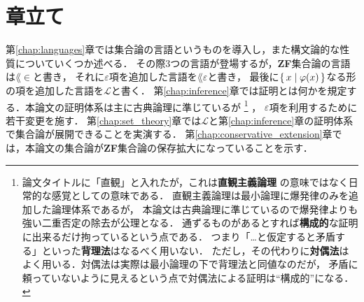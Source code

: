 \section{章立て}
	第\ref{chap:languages}章では集合論の言語というものを導入し，また構文論的な性質についていくつか述べる．
	その際3つの言語が登場するが，{\bf ZF}集合論の言語は$\lang{\in}$と書き，
	それに$\varepsilon$項を追加した言語を$\lang{\varepsilon}$と書き，
	最後に$\{\, x \mid \varphi(x)\, \}$なる形の項を追加した言語を$\mathcal{L}$と書く．
	第\ref{chap:inference}章では証明とは何かを規定する．本論文の証明体系は主に古典論理に準じているが
	\footnote{
		論文タイトルに「直観」と入れたが，これは{\bf 直観主義論理}
		の意味ではなく日常的な感覚としての意味である．
		直観主義論理は最小論理に爆発律のみを追加した論理体系であるが，
		本論文は古典論理に準じているので爆発律よりも強い二重否定の除去が公理となる．
		通ずるものがあるとすれば{\bf 構成的}な証明に出来るだけ拘っているという点である．
		つまり「…と仮定すると矛盾する」といった{\bf 背理法}はなるべく用いない．
		ただし，その代わりに{\bf 対偶法}はよく用いる．対偶法は実際は最小論理の下で背理法と同値なのだが，
		矛盾に頼っていないように見えるという点で対偶法による証明は``構成的''になる．
	}
	，
	$\varepsilon$項を利用するために若干変更を施す．
	第\ref{chap:set_theory}章では$\mathcal{L}$と第\ref{chap:inference}章の証明体系で集合論が展開できることを実演する．
	第\ref{chap:conservative_extension}章では，本論文の集合論が{\bf ZF}集合論の保存拡大になっていることを示す．
	
	
